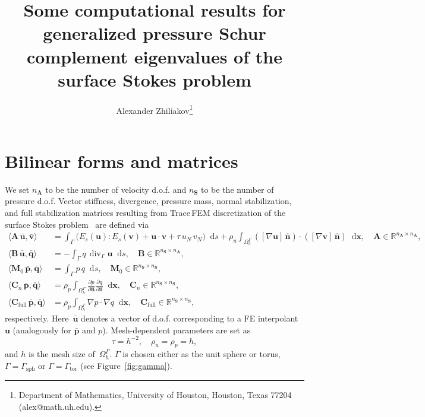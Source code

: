 \documentclass[12pt]{article}
\title{Some computational results for generalized pressure Schur complement eigenvalues of the surface Stokes problem}
\author{
	Alexander Zhiliakov\thanks{Department of Mathematics, University of Houston, Houston, Texas 77204 (alex@math.uh.edu).}
}
\newcommand{\vect}[1]{\boldsymbol{\mathbf{#1}}}
\newcommand*\diff{\mathop{}\!\mathrm{d}}
\DeclareMathOperator{\Div}{div}
\newcommand{\sphere}{{\Gamma_{\text{sph}}}}
\newcommand{\tor}{{\Gamma_{\text{tor}}}}
\begin{document}
	
\maketitle
	
\let\oldtabular\tabular
\renewcommand{\tabular}[1][1.5]{\def\arraystretch{#1}\oldtabular}

\section{Bilinear forms and matrices}

We set $n_{\vect A}$ to be the number of velocity d.o.f. and $n_{\vect S}$ to be the number of pressure d.o.f. Vector stiffness, divergence, pressure mass, normal stabilization, and full stabilization matrices resulting from Trace\,FEM discretization of the surface Stokes problem~\cite{surfstokes} are defined via
\begin{align}
	\langle \vect A\,\bar{\vect u}, \bar{\vect v} \rangle &= 
		\int_{\Gamma} \big( E_s(\vect u) : E_s(\vect v) + \vect u\cdot\vect v + \tau\,u_N\,v_N \big) \diff{s} + 
		\rho_u \int_{\Omega_h^{\Gamma}} ([\nabla\vect u]\,\hat{\vect n})\cdot([\nabla\vect v]\,\hat{\vect n}) \diff{\vect x}, \quad \vect A \in \mathbb R^{n_{\vect A} \times n_{\vect A}},\\
	\langle \vect B\,\bar{\vect u}, \bar{\vect q} \rangle &= 
		-\int_{\Gamma} q\,\Div_{\Gamma} \vect u \diff{s}, \quad \vect B \in \mathbb R^{n_{\vect S} \times n_{\vect A}},\\
	\langle \vect M_0\,\bar{\vect p}, \bar{\vect q} \rangle &=
		\int_{\Gamma} p\,q \diff{s}, \quad \vect M_0 \in \mathbb R^{n_{\vect S} \times n_{\vect S}},\\
	\langle \vect C_n\,\bar{\vect p}, \bar{\vect q} \rangle &=
		\rho_p \int_{\Omega^{\Gamma}_h} \frac{\partial p}{\partial\hat{\vect n}} \frac{\partial q}{\partial\hat{\vect n}} \diff{\vect x}, \quad \vect C_n \in \mathbb R^{n_{\vect S} \times n_{\vect S}},\\
	\langle \vect C_{\text{full}}\,\bar{\vect p}, \bar{\vect q} \rangle &=
		\rho_p \int_{\Omega^{\Gamma}_h} \nabla p \cdot \nabla q \diff{\vect x}, \quad \vect C_{\text{full}} \in \mathbb R^{n_{\vect S} \times n_{\vect S}},		 
\end{align}
respectively. Here~$\bar{\vect u}$ denotes a vector of d.o.f. corresponding to a FE interpolant~$\vect u$ (analogously for $\bar{\vect p}$ and $p$). Mesh-dependent parameters are set as
\begin{equation}
	\tau = h^{-2}, \quad \rho_u = \rho_p = h,
\end{equation}
and $h$ is the mesh size of~$\Omega^{\Gamma}_h$. $\Gamma$ is chosen either as the unit sphere or torus, $\Gamma = \sphere$ or $\Gamma = \tor$ (see Figure~\ref{fig:gamma}).
\end{document}
